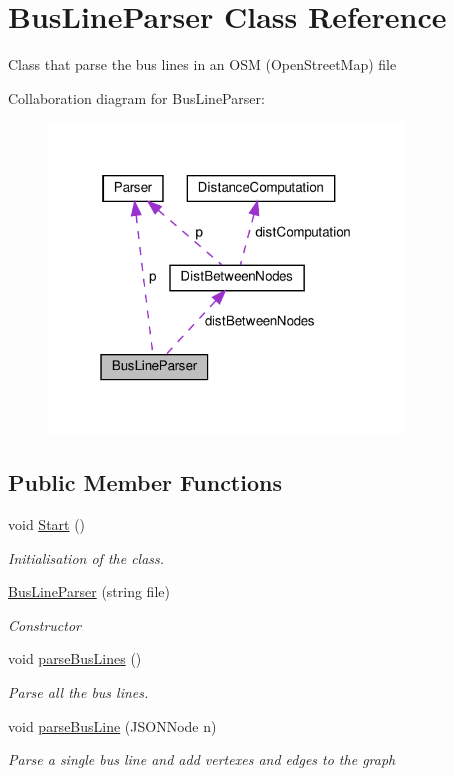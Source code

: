 \hypertarget{classBusLineParser}{}\section{Bus\+Line\+Parser Class Reference}
\label{classBusLineParser}


Class that parse the bus lines in an O\+SM (Open\+Street\+Map) file  




Collaboration diagram for Bus\+Line\+Parser\+:\nopagebreak
\begin{figure}[H]
\begin{center}
\leavevmode
\includegraphics[width=268pt]{classBusLineParser__coll__graph}
\end{center}
\end{figure}
\subsection*{Public Member Functions}
\begin{DoxyCompactItemize}
\item 
void \hyperlink{classBusLineParser_ac9f10220ed1011b9a384f53b792fc35a}{Start} ()
\begin{DoxyCompactList}\small\item\em Initialisation of the class. \end{DoxyCompactList}\item 
\hyperlink{classBusLineParser_afbe7ee8e82c3e3d52f25e4eef11e1f7d}{Bus\+Line\+Parser} (string file)
\begin{DoxyCompactList}\small\item\em Constructor \end{DoxyCompactList}\item 
void \hyperlink{classBusLineParser_aa441912e091262f0abcea5fd6cc72d5c}{parse\+Bus\+Lines} ()
\begin{DoxyCompactList}\small\item\em Parse all the bus lines. \end{DoxyCompactList}\item 
void \hyperlink{classBusLineParser_aee67937c998aa86f10951a739b1e8c60}{parse\+Bus\+Line} (J\+S\+O\+N\+Node n)
\begin{DoxyCompactList}\small\item\em Parse a single bus line and add vertexes and edges to the graph \end{DoxyCompactList}\end{DoxyCompactItemize}
